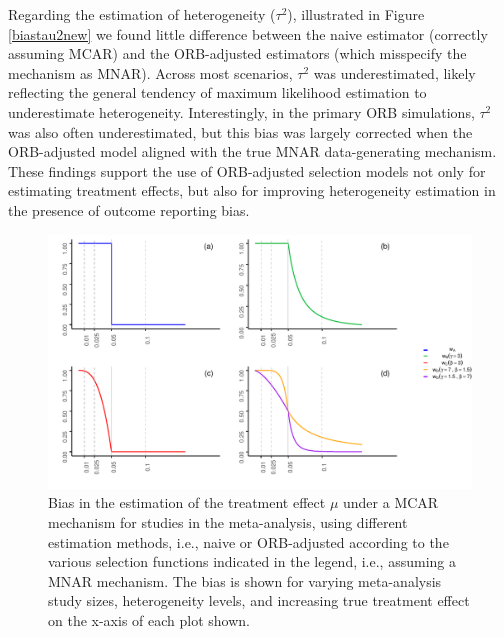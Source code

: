 \documentclass{article}\usepackage[]{graphicx}\usepackage[]{xcolor}
\makeatletter
\def\maxwidth{ %
  \ifdim\Gin@nat@width>\linewidth
    \linewidth
  \else
    \Gin@nat@width
  \fi
}
\makeatother
\begin{document}
\bigskip

Regarding the estimation of heterogeneity ($\tau^2$), illustrated in Figure \ref{biastau2new} we found little difference between the naive estimator (correctly assuming MCAR) and the ORB-adjusted estimators (which misspecify the mechanism as MNAR). Across most scenarios, $\tau^2$ was underestimated, likely reflecting the general tendency of maximum likelihood estimation to underestimate heterogeneity. Interestingly, in the primary ORB simulations, $\tau^2$ was also often underestimated, but this bias was largely corrected when the ORB-adjusted model aligned with the true MNAR data-generating mechanism. These findings support the use of ORB-adjusted selection models not only for estimating treatment effects, but also for improving heterogeneity estimation in the presence of outcome reporting bias.

\begin{figure}[!hbt]
\centering
\caption{Bias in the estimation of the treatment effect $\mu$ under a MCAR mechanism for studies in the meta-analysis, using different estimation methods, i.e., naive or ORB-adjusted according to the various selection functions indicated in the legend, i.e., assuming a MNAR mechanism. The bias is shown for varying meta-analysis study sizes, heterogeneity levels, and increasing true treatment effect on the x-axis of each plot shown.\\[0.5em]}


{\centering \includegraphics[width=\maxwidth]{figures/plots-unnamed-chunk-1-1} 

}



\label{res1new}
\end{figure}
\end{document}
